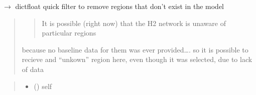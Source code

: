 \documentclass[letterpaper,10pt,english]{sphinxmanual}
\begin{document}
\begin{fulllineitems}
\label{\detokenize{src.models.hydrogen.model.h2_model:src.models.hydrogen.model.h2_model.H2Model}}
\pysigstartsignatures
\pysiglinewithargsret
{}
{\sphinxparamcomma {}}
{}
\pysigstopsignatures{}

\begin{fulllineitems}
\label{\detokenize{src.models.hydrogen.model.h2_model:src.models.hydrogen.model.h2_model.H2Model._active}}
\pysigstartsignatures
\pysigline
{}
\pysigstopsignatures
\end{fulllineitems}


\begin{fulllineitems}
\label{\detokenize{src.models.hydrogen.model.h2_model:src.models.hydrogen.model.h2_model.H2Model._filter_update_info}}
\pysigstartsignatures
\pysiglinewithargsret
{}
{}
{{ $\rightarrow$ dict\DUrole{p}{{[}}{\hyperref[\detokenize{src.integrator.utilities:src.integrator.utilities.HI}]{\sphinxcrossref{HI}}}float\DUrole{p}{{]}}}}
\pysigstopsignatures
\sphinxAtStartPar
quick filter to remove regions that don’t exist in the model
\begin{quote}
\begin{quote}

\sphinxAtStartPar
It is possible (right now) that the H2 network is unaware of particular regions
\end{quote}

\sphinxAtStartPar
because no baseline data for them was ever provided…. so it is possible to
recieve and “unkown” region here, even though it was selected, due to lack of
data
\end{quote}
\begin{quote}\begin{description}
\begin{itemize}
\item {} 
\sphinxAtStartPar
{} ({\hyperref[\detokenize{src.models.hydrogen.model.h2_model:src.models.hydrogen.model.h2_model.H2Model}]{}}) \textendash{} self


\end{itemize}
\end{description}
\end{quote}
\end{fulllineitems}
\end{fulllineitems}
\end{document}
